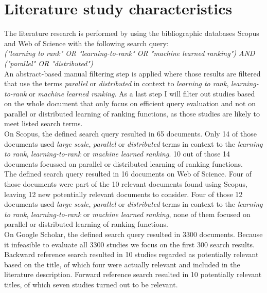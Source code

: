 \section{Literature study characteristics}
The literature research is performed by using the bibliographic databases Scopus and Web of Science with the following search query:\\

\emph{("learning to rank" \emph{OR} "learning-to-rank" \emph{OR} "machine learned ranking") \emph{AND} ("parallel" \emph{OR} "distributed")}\\
 
An abstract-based manual filtering step is applied where those results are filtered that use the terms \emph{parallel} or \emph{distributed} in context to \emph{learning to rank}, \emph{learning-to-rank} or \emph{machine learned ranking}. As a last step I will filter out studies based on the whole document that only focus on efficient query evaluation and not on parallel or distributed learning of ranking functions, as those studies are likely to meet listed search terms.\\

On Scopus, the defined search query resulted in 65 documents. Only 14 of those documents used \emph{large scale}, \emph{parallel} or \emph{distributed} terms in context to the \emph{learning to rank}, \emph{learning-to-rank} or \emph{machine learned ranking}. 10 out of those 14 documents focussed on parallel or distributed learning of ranking functions.\\

The defined search query resulted in 16 documents on Web of Science. Four of those documents were part of the 10 relevant documents found using Scopus, leaving 12 new potentially relevant documents to consider. Four of those 12 documents used \emph{large scale}, \emph{parallel} or \emph{distributed} terms in context to the \emph{learning to rank}, \emph{learning-to-rank} or \emph{machine learned ranking}, none of them focused on parallel or distributed learning of ranking functions.\\

On Google Scholar, the defined search query resulted in 3300 documents. Because it infeasible to evaluate all 3300 studies we focus on the first 300 search results.\\

Backward reference search resulted in 10 studies regarded as potentially relevant based on the title, of which four were actually relevant and included in the literature description. Forward reference search resulted in 10 potentially relevant titles, of which seven studies turned out to be relevant.\\

